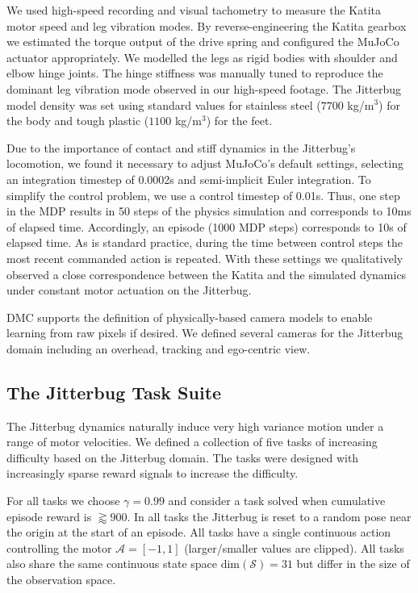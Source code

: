 \documentclass[letterpaper, 10 pt, conference]{ieeeconf}
\begin{document}
We used high-speed recording and visual tachometry to measure the Katita motor speed and leg vibration modes.
By reverse-engineering the Katita gearbox we estimated the torque output of the drive spring and configured the MuJoCo actuator appropriately.
We modelled the legs as rigid bodies with shoulder and elbow hinge joints.
The hinge stiffness was manually tuned to reproduce the dominant leg vibration mode observed in our high-speed footage.
The Jitterbug model density was set using standard values for stainless steel ($7700$ kg/m$^3$) for the body and tough plastic ($1100$ kg/m$^3$) for the feet.

Due to the importance of contact and stiff dynamics in the Jitterbug's locomotion, we found it necessary to adjust MuJoCo's default settings, selecting an integration timestep of 0.0002s and semi-implicit Euler integration.
To simplify the control problem, we use a control timestep of 0.01s.
Thus, one step in the MDP results in 50 steps of the physics simulation and corresponds to 10ms of elapsed time.
Accordingly, an episode (1000 MDP steps) corresponds to 10s of elapsed time.
As is standard practice, during the time between control steps the most recent commanded action is repeated.
With these settings we qualitatively observed a close correspondence between the Katita and the simulated dynamics under constant motor actuation on the Jitterbug.

DMC supports the definition of physically-based camera models to enable learning from raw pixels if desired.
We defined several cameras for the Jitterbug domain including an overhead, tracking and ego-centric view.

\subsection{The Jitterbug Task Suite}

The Jitterbug dynamics naturally induce very high variance motion under a range of motor velocities.
We defined a collection of five tasks of increasing difficulty based on the Jitterbug domain.
The tasks were designed with increasingly sparse reward signals to increase the difficulty.

For all tasks we choose $\gamma = 0.99$ and consider a task solved when cumulative episode reward is $\gtrapprox 900$.
In all tasks the Jitterbug is reset to a random pose near the origin at the start of an episode.
All tasks have a single continuous action controlling the motor $\mathcal{A} = [-1, 1]$ (larger/smaller values are clipped).
All tasks also share the same continuous state space $\text{dim}(\mathcal{S}) = 31$ but differ in the size of the observation space.
\end{document}
